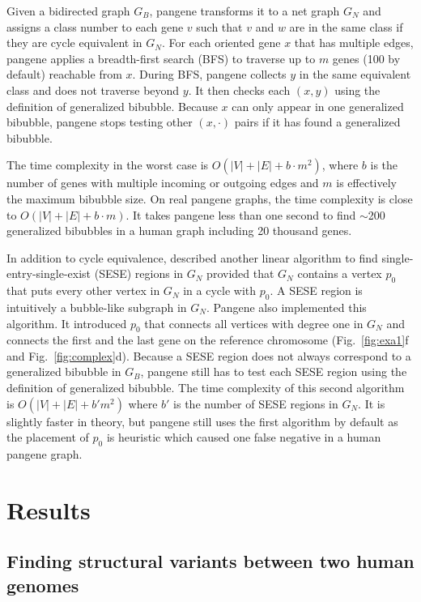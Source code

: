\documentclass[webpdf,contemporary,large,namedate]{oup-authoring-template}%
\begin{document}
Given a bidirected graph $G_B$, pangene transforms it to a net graph $G_N$
and assigns a class number to each gene $v$ such that $v$ and $w$ are in the same class if they are cycle equivalent in $G_N$.
For each oriented gene $x$ that has multiple edges,
pangene applies a breadth-first search (BFS) to traverse up to $m$ genes (100 by default) reachable from $x$.
During BFS, pangene collects $y$ in the same equivalent class and does not traverse beyond $y$.
It then checks each $(x,y)$ using the definition of generalized bibubble.
Because $x$ can only appear in one generalized bibubble, pangene stops testing other $(x,\cdot)$ pairs
if it has found a generalized bibubble.

The time complexity in the worst case is $O(|V|+|E|+b\cdot m^2)$, where $b$ is the number of genes with multiple incoming or outgoing edges
and $m$ is effectively the maximum bibubble size.
On real pangene graphs, the time complexity is close to $O(|V|+|E|+b\cdot m)$.
It takes pangene less than one second to find $\sim$200 generalized bibubbles
in a human graph including 20 thousand genes.

In addition to cycle equivalence, \citet{DBLP:conf/pldi/JohnsonPP94}
described another linear algorithm to find single-entry-single-exist (SESE) regions in $G_N$
provided that $G_N$ contains a vertex $p_0$ that puts every other vertex in $G_N$ in a cycle with $p_0$.
A SESE region is intuitively a bubble-like subgraph in $G_N$.
Pangene also implemented this algorithm.
It introduced $p_0$ that connects all vertices with degree one in $G_N$
and connects the first and the last gene on the reference chromosome (Fig.~\ref{fig:exa1}f and Fig.~\ref{fig:complex}d).
Because a SESE region does not always correspond to a generalized bibubble in $G_B$,
pangene still has to test each SESE region using the definition of generalized bibubble.
The time complexity of this second algorithm is $O(|V|+|E|+b'm^2)$ where $b'$ is the number of
SESE regions in $G_N$.
It is slightly faster in theory,
but pangene still uses the first algorithm by default
as the placement of $p_0$ is heuristic which caused one false negative in a human pangene graph.

\section{Results}

\subsection{Finding structural variants between two human genomes}
\end{document}
